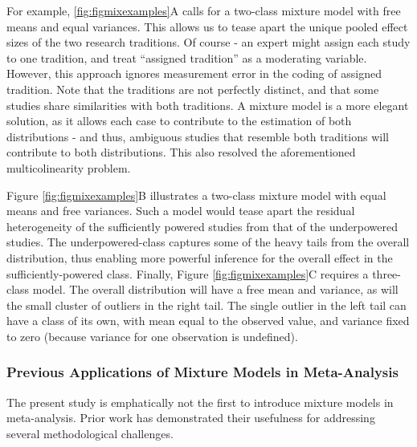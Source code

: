\documentclass[
  english,
  man, noextraspace,floatsintext]{apa6}
\begin{document}
For example, \ref{fig:figmixexamples}A calls for a two-class mixture model with free means and equal variances.
This allows us to tease apart the unique pooled effect sizes of the two research traditions.
Of course - an expert might assign each study to one tradition, and treat ``assigned tradition'' as a moderating variable.
However, this approach ignores measurement error in the coding of assigned tradition.
Note that the traditions are not perfectly distinct, and that some studies share similarities with both traditions.
A mixture model is a more elegant solution, as it allows each case to contribute to the estimation of both distributions - and thus, ambiguous studies that resemble both traditions will contribute to both distributions.
This also resolved the aforementioned multicolinearity problem.

Figure \ref{fig:figmixexamples}B illustrates a two-class mixture model with equal means and free variances.
Such a model would tease apart the residual heterogeneity of the sufficiently powered studies from that of the underpowered studies.
The underpowered-class captures some of the heavy tails from the overall distribution,
thus enabling more powerful inference for the overall effect in the sufficiently-powered class.
Finally, Figure \ref{fig:figmixexamples}C requires a three-class model.
The overall distribution will have a free mean and variance,
as will the small cluster of outliers in the right tail.
The single outlier in the left tail can have a class of its own, with mean equal to the observed value, and variance fixed to zero (because variance for one observation is undefined).

\subsubsection{Previous Applications of Mixture Models in Meta-Analysis}\label{previous-applications-of-mixture-models-in-meta-analysis}

The present study is emphatically not the first to introduce mixture models in meta-analysis.
Prior work has demonstrated their usefulness for addressing several methodological challenges.
\end{document}
